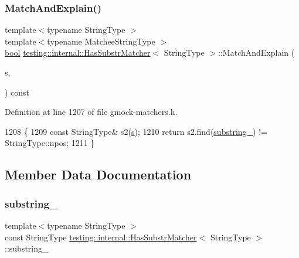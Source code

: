 \subsubsection{\texorpdfstring{Match\+And\+Explain()}{MatchAndExplain()}\hspace{0.1cm}{\footnotesize\ttfamily [2/2]}}
{\footnotesize\ttfamily template$<$typename String\+Type $>$ \\
template$<$typename Matchee\+String\+Type $>$ \\
\hyperlink{classbool}{bool} \hyperlink{classtesting_1_1internal_1_1HasSubstrMatcher}{testing\+::internal\+::\+Has\+Substr\+Matcher}$<$ String\+Type $>$\+::Match\+And\+Explain (\begin{DoxyParamCaption}\item[{const Matchee\+String\+Type \&}]{s,  }\item[{\hyperlink{classtesting_1_1MatchResultListener}{Match\+Result\+Listener} $\ast$}]{ }\end{DoxyParamCaption}) const\hspace{0.3cm}{\ttfamily [inline]}}



Definition at line 1207 of file gmock-\/matchers.\+h.


\begin{DoxyCode}
1208                                                      \{
1209     \textcolor{keyword}{const} StringType& s2(\hyperlink{namespaceservice__node__3_aa976421a49e0b54f23833423400849ae}{s});
1210     \textcolor{keywordflow}{return} s2.find(\hyperlink{classtesting_1_1internal_1_1HasSubstrMatcher_ac15185527d4f52eda4574c8b845a52f3}{substring\_}) != StringType::npos;
1211   \}
\end{DoxyCode}


\subsection{Member Data Documentation}
\mbox{\label{classtesting_1_1internal_1_1HasSubstrMatcher_ac15185527d4f52eda4574c8b845a52f3}} 
\subsubsection{\texorpdfstring{substring\+\_\+}{substring\_}}
{\footnotesize\ttfamily template$<$typename String\+Type $>$ \\
const String\+Type \hyperlink{classtesting_1_1internal_1_1HasSubstrMatcher}{testing\+::internal\+::\+Has\+Substr\+Matcher}$<$ String\+Type $>$\+::substring\+\_\+\hspace{0.3cm}{\ttfamily [private]}}



